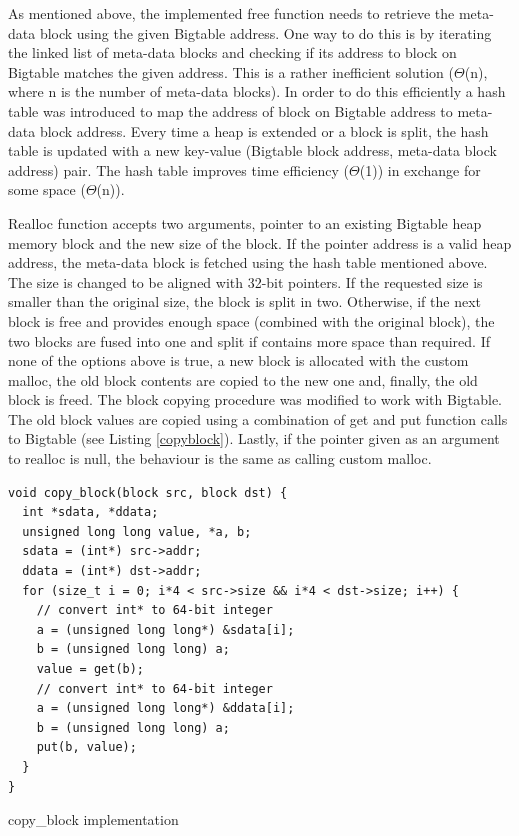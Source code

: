\documentclass[bsc,frontabs,twoside,singlespacing,parskip,deptreport]{infthesis}     %
\begin{document}
As mentioned above, the implemented free function needs to retrieve the meta-data block using the given Bigtable address. One way to do this is by iterating the linked list of meta-data blocks and checking if its address to block on Bigtable matches the given address. This is a rather inefficient solution (\(\Theta\)(n), where n is the number of meta-data blocks). In order to do this efficiently a hash table was introduced to map the address of block on Bigtable address to meta-data block address. Every time a heap is extended or a block is split, the hash table is updated with a new key-value (Bigtable block address, meta-data block address) pair. The hash table improves time efficiency (\(\Theta\)(1)) in exchange for some space (\(\Theta\)(n)).

Realloc function accepts two arguments, pointer to an existing Bigtable heap memory block and the new size of the block. If the pointer address is a valid heap address, the meta-data block is fetched using the hash table mentioned above. The size is changed to be aligned with 32-bit pointers. If the requested size is smaller than the original size, the block is split in two. Otherwise, if the next block is free and provides enough space (combined with the original block), the two blocks are fused into one and split if contains more space than required. If none of the options above is true, a new block is allocated with the custom malloc, the old block contents are copied to the new one and, finally, the old block is freed. The block copying procedure was modified to work with Bigtable. The old block values are copied using a combination of get and put function calls to Bigtable (see Listing \ref{copyblock}). Lastly, if the pointer given as an argument to realloc is null, the behaviour is the same as calling custom malloc.

\begin{listing}
\begin{verbatim}
void copy_block(block src, block dst) {
  int *sdata, *ddata;
  unsigned long long value, *a, b;
  sdata = (int*) src->addr;
  ddata = (int*) dst->addr;
  for (size_t i = 0; i*4 < src->size && i*4 < dst->size; i++) {
    // convert int* to 64-bit integer
    a = (unsigned long long*) &sdata[i];
    b = (unsigned long long) a;  
    value = get(b);
    // convert int* to 64-bit integer
    a = (unsigned long long*) &ddata[i];
    b = (unsigned long long) a;
    put(b, value);
  }
}
\end{verbatim}
\caption{copy\_block implementation}
\label{copyblock}
\end{listing}
\end{document}
